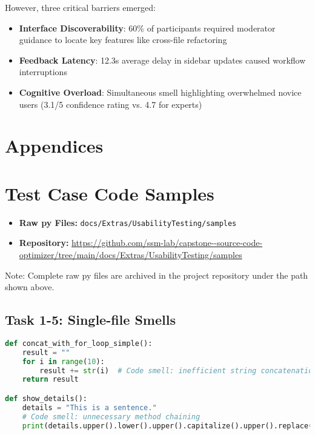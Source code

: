 \documentclass{article}
\begin{document}
However, three critical barriers emerged:
\begin{itemize}
\item \textbf{Interface Discoverability}: 60\% of participants required moderator guidance to locate key features like cross-file refactoring
\item \textbf{Feedback Latency}: 12.3s average delay in sidebar updates caused workflow interruptions
\item \textbf{Cognitive Overload}: Simultaneous smell highlighting overwhelmed novice users (3.1/5 confidence rating vs. 4.7 for experts)
\end{itemize}

\newpage
\section*{Appendices}

\section{Test Case Code Samples}
\label{app:code}


\begin{itemize}
    \item \textbf{Raw py Files:} \texttt{docs/Extras/UsabilityTesting/samples}
    \item \textbf{Repository:} \url{https://github.com/ssm-lab/capstone--source-code-optimizer/tree/main/docs/Extras/UsabilityTesting/samples}
\end{itemize}

\noindent
\footnotesize{Note: Complete raw py files are archived in the project repository under the path shown above.}


\subsection{Task 1-5: Single-file Smells}
\begin{lstlisting}[language=Python,caption={String Manipulation Smells (sample.py)},label=lst:task15]
def concat_with_for_loop_simple():
    result = ""
    for i in range(10):
        result += str(i)  # Code smell: inefficient string concatenation
    return result

def show_details():
    details = "This is a sentence."
    # Code smell: unnecessary method chaining
    print(details.upper().lower().upper().capitalize().upper().replace("|", "-"))
\end{lstlisting}
\end{document}
